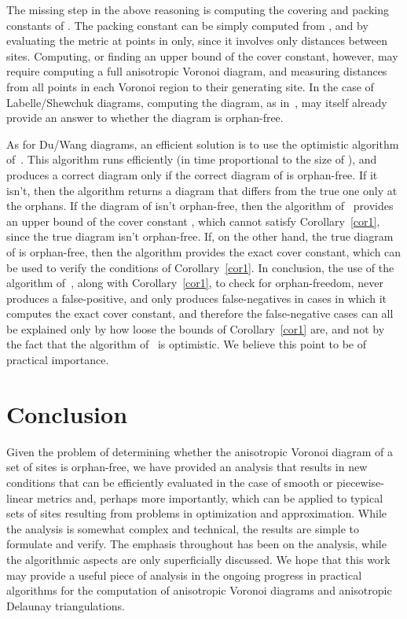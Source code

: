 \documentclass[11pt]{article}
\begin{document}
The missing step in the above reasoning is computing the covering and packing constants of . 
The packing constant can be simply computed from , and by evaluating the metric at points in  only, since it involves only distances between sites. 
Computing, or finding an upper bound of the cover constant, however, may require computing a full anisotropic Voronoi diagram, and measuring distances from all points in each Voronoi region to their generating site. In the case of Labelle/Shewchuk diagrams, computing the diagram, as in~\cite{LS}, may itself already provide an answer to whether the diagram is orphan-free. 

As for Du/Wang diagrams, an efficient solution is to use the optimistic algorithm of~\cite{adt}. This algorithm runs efficiently (in time proportional to the size of ), 
and produces a correct diagram only if the correct diagram of  is orphan-free. If it isn't, then the algorithm returns a diagram that differs from the true one only at the orphans. 
If the diagram of  isn't orphan-free, then the algorithm of~\cite{adt} provides an upper bound of the cover constant , which cannot satisfy Corollary~\ref{cor1}, since the true diagram isn't orphan-free. If, on the other hand, the true diagram of  is orphan-free, then the algorithm provides the exact cover constant, which can be used to verify the conditions of Corollary~\ref{cor1}. 
In conclusion, the use of the algorithm of~\cite{adt}, along with Corollary~\ref{cor1}, to check for orphan-freedom, never produces a false-positive, 
and only produces false-negatives in cases in which it computes the exact cover constant, and therefore the false-negative cases can all be explained only by how loose the bounds of Corollary~\ref{cor1} are, and not by the fact that the algorithm of~\cite{adt} is optimistic. We believe this point to be of practical importance. 

\section{Conclusion}

Given the problem of determining whether the anisotropic Voronoi diagram of a set of sites is orphan-free, 
we have provided an analysis that results in new conditions that can be efficiently evaluated in the case of smooth or piecewise-linear metrics and, 
perhaps more importantly, which can be applied to typical sets of sites resulting from problems in  optimization and approximation. 
While the analysis is somewhat complex and technical, the results are simple to formulate and verify. 
The emphasis throughout has been on the analysis, while the algorithmic aspects are only superficially discussed. 
We hope that this work may provide a useful piece of analysis in the ongoing progress in practical algorithms for the computation of anisotropic Voronoi diagrams and anisotropic Delaunay triangulations. 
\end{document}
